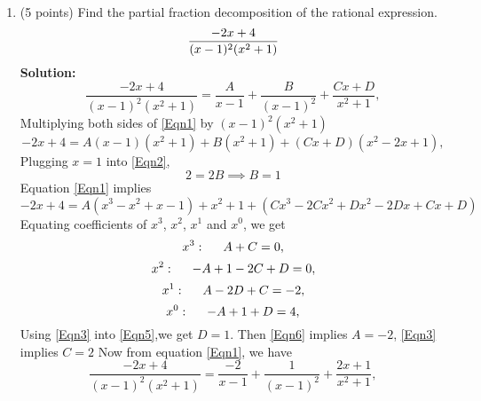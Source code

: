 \documentclass[paper=a4, fontsize=11pt]{scrartcl} %
\numberwithin{equation}{section} %
\numberwithin{figure}{section} %
\numberwithin{table}{section} %
\begin{document}
\begin{enumerate}
\item (5 points) Find the partial fraction decomposition of the rational expression.
\begin{equation*}
\huge\frac{-2x+4}{(x-1)^2(x^2+1)}
\end{equation*}
\textbf{Solution:}\text{  }
\begin{equation}
\frac{-2x+4}{(x-1)^2(x^2+1)}=\frac{A}{x-1}+\frac{B}{(x-1)^2}+\frac{Cx+D}{x^2+1},\label{Eqn1}
\end{equation}
Multiplying both sides of \eqref{Eqn1} by \text{   } $(x-1)^2(x^2+1)$
\begin{equation}
-2x+4=A(x-1)(x^2+1)+B(x^2+1)+(Cx+D)(x^2-2x+1), \label{Eqn2}
\end{equation}
Plugging $x=1$ into \eqref{Eqn2},
\begin{equation}
2=2B\implies\boxed{B=1}
\end{equation}
Equation \eqref{Eqn1} implies
\begin{equation}
-2x+4=A(x^3-x^2+x-1)+x^2+1+(Cx^3-2Cx^2+Dx^2-2Dx+Cx+D)
\end{equation}
Equating coefficients of $x^3$, $x^2$, $x^1$ and $x^0$, we get
\begin{equation}
x^3: \hspace{5mm}A+C=0,\label{Eqn3}
\end{equation}
\begin{equation}
x^2: \hspace{5mm}-A+1-2C+D=0,\label{Eqn4}
\end{equation}
\begin{equation}
x^1: \hspace{5mm}A-2D+C=-2,\label{Eqn5}
\end{equation}
\begin{equation}
x^0: \hspace{5mm}-A+1+D=4,\label{Eqn6}
\end{equation}
Using \eqref{Eqn3} into \eqref{Eqn5},we get\text{  } $\boxed{D=1}$. Then \eqref{Eqn6} implies $\boxed{A=-2}$, \eqref{Eqn3} implies $\boxed{C=2}$
Now from equation \eqref{Eqn1}, we have
\begin{equation}
\frac{-2x+4}{(x-1)^2(x^2+1)}=\frac{-2}{x-1}+\frac{1}{(x-1)^2}+\frac{2x+1}{x^2+1},\label{Eqn1}
\end{equation}
\newpage


\end{enumerate}
\end{document}
